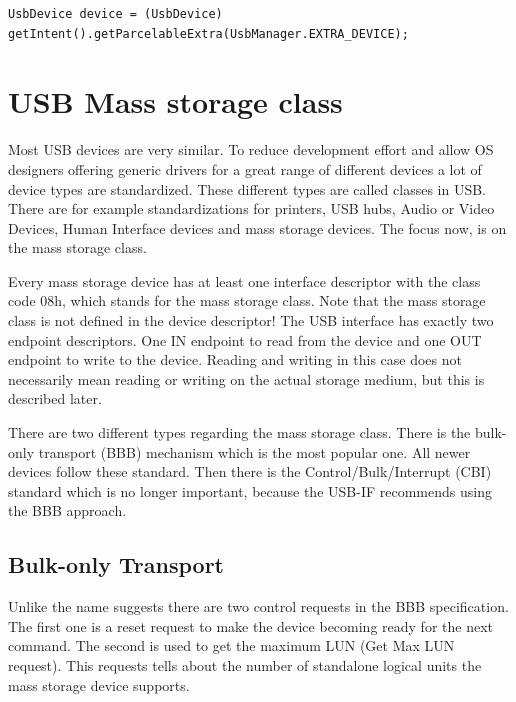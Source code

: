\lstset{language=Java}
\begin{lstlisting}[caption={Accessing the UsbDevice in the Activity, compare to: \cite{android_usb_host}}, label=listing:access_usb_dev_activity]
UsbDevice device = (UsbDevice) getIntent().getParcelableExtra(UsbManager.EXTRA_DEVICE);
\end{lstlisting}

\chapter{USB Mass storage class}

Most USB devices are very similar. To reduce development effort and allow OS designers offering generic drivers for a great range of different devices a lot of device types are standardized. These different types are called classes in USB. There are for example standardizations for printers, USB hubs, Audio or Video Devices, Human Interface devices and mass storage devices\cite{usb_classes}. The focus now, is on the mass storage class.

Every mass storage device has at least one interface descriptor with the class code 08h, which stands for the mass storage class. Note that the mass storage class is not defined in the device descriptor! The USB interface has exactly two endpoint descriptors. One IN endpoint to read from the device and one OUT endpoint to write to the device\cite{usb_ms_jan}. Reading and writing in this case does not necessarily mean reading or writing on the actual storage medium, but this is described later.

There are two different types regarding the mass storage class. There is the bulk-only transport (BBB) mechanism which is the most popular one. All newer devices follow these standard. Then there is the Control/Bulk/Interrupt (CBI) standard which is no longer important, because the USB-IF recommends using the BBB approach\cite{usb_ms_jan}.

\section{Bulk-only Transport}

Unlike the name suggests there are two control requests in the BBB specification. The first one is a reset request to make the device becoming ready for the next command. The second is used to get the maximum LUN (Get Max LUN request). This requests tells about the number of standalone logical units the mass storage device supports\cite{usb_ms_jan}.

